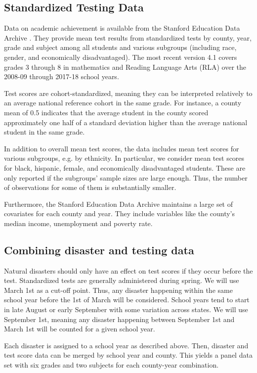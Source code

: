 \subsection{Standardized Testing Data}

Data on academic achievement is available from the Stanford Education Data Archive \citep{SEDA}. They provide mean test results from standardized tests by county, year, grade and subject among all students and various subgroups (including race, gender, and economically disadvantaged). The most recent version 4.1 covers grades 3 through 8 in mathematics and Reading Language Arts (RLA) over the 2008-09 through 2017-18 school years.

Test scores are cohort-standardized, meaning they can be interpreted relatively to an average national reference cohort in the same grade. For instance, a county mean of 0.5 indicates that the average student in the county scored approximately one half of a standard deviation higher than the average national student in the same grade.

In addition to overall mean test scores, the data includes mean test scores for various subgroups, e.g. by ethnicity. In particular, we consider mean test scores for black, hispanic, female, and economically disadvantaged students. These are only reported if the subgroups' sample sizes are large enough. Thus, the number of observations for some of them is substantially smaller.

Furthermore, the Stanford Education Data Archive maintains a large set of covariates for each county and year. They include variables like the county's median income, unemployment and poverty rate.


\subsection{Combining disaster and testing data}

Natural disasters should only have an effect on test scores if they occur before the test. Standardized tests are generally administered during spring. We will use March 1st as a cut-off point. Thus, any disaster happening within the same school year before the 1st of March will be considered. School years tend to start in late August or early September with some variation across states. We will use September 1st, meaning any disaster happening between September 1st and March 1st will be counted for a given school year.

Each disaster is assigned to a school year as described above. Then, disaster and test score data can be merged by school year and county. This yields a panel data set with six grades and two subjects for each county-year combination.

